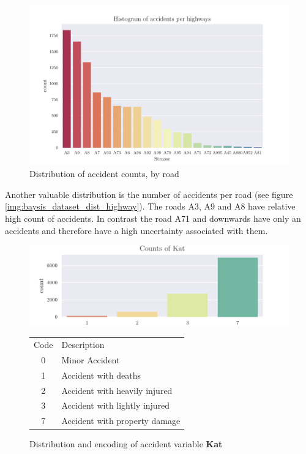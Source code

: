 \begin{figure}[ht]
	\centering
	\includegraphics[scale=0.75]{CorrAnalysis/data/BAYSIS/01_dataset/plots/baysis_dataset_hist_highway}
	\caption{Distribution of accident counts, by road}
	\label{img:baysis_dataset_dist_highway}
\end{figure}

Another valuable distribution is the number of accidents per road (see figure \autoref{img:baysis_dataset_dist_highway}). The roads A3, A9 and A8 have relative high count of accidents. In contrast the road A71 and downwards have only an accidents and therefore have a high uncertainty associated with them. 

\begin{figure}[ht]
    \centering
	\includegraphics[scale=1.0]{CorrAnalysis/data/BAYSIS/01_dataset/plots/baysis_dataset_count_Kat}
	\qquad
	\small
    \begin{tabular}[b]{c|l}
      Code 	& Description \\
	  0 	& Minor Accident  \\
	  1 	& Accident with deaths  \\ 
	  2 	& Accident with heavily injured  \\
	  3 	& Accident with lightly injured  \\
	  7 	& Accident with property damage  \\
	\end{tabular}
    \captionsetup{labelformat=andtable}
	\caption{Distribution and encoding of accident variable \textbf{Kat}}
  \end{figure}


